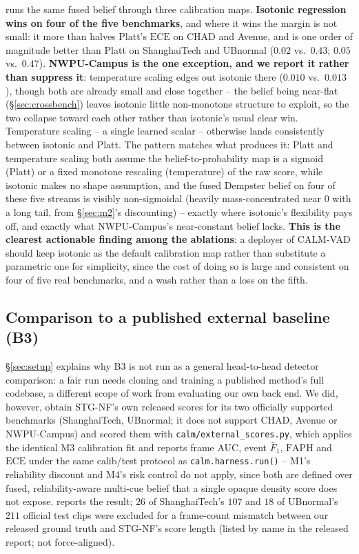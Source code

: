 \documentclass[conference]{IEEEtran}
\newcommand{\faph}{\mathrm{FAPH}}
\newcommand{\ece}{\mathrm{ECE}}
\newcommand{\method}{CALM-VAD}
\begin{document}
 runs the same fused belief through three
calibration maps. \textbf{Isotonic regression wins on four of the five
benchmarks}, and where it wins the margin is not small: it more than halves
Platt's $\ece$ on CHAD and Avenue, and is one order of magnitude better than
Platt on ShanghaiTech and UBnormal ($0.02$ vs.\ $0.43$; $0.05$ vs.\ $0.47$).
\textbf{NWPU-Campus is the one exception, and we report it rather than
suppress it}: temperature scaling edges out isotonic there ($0.010$ vs.\
$0.013$), though both are already small and close together -- the belief
being near-flat (\S\ref{sec:crossbench}) leaves isotonic little
non-monotone structure to exploit, so the two collapse toward each other
rather than isotonic's usual clear win. Temperature scaling -- a single
learned scalar -- otherwise lands consistently between isotonic and Platt.
The pattern matches what produces it: Platt and temperature scaling both
assume the belief-to-probability map is a sigmoid (Platt) or a fixed
monotone rescaling (temperature) of the raw score, while isotonic makes no
shape assumption, and the fused Dempster belief on four of these five
streams is visibly non-sigmoidal (heavily mass-concentrated near $0$ with a
long tail, from \S\ref{sec:m2}'s discounting) -- exactly where isotonic's
flexibility pays off, and exactly what NWPU-Campus's near-constant belief
lacks. \textbf{This is the clearest actionable finding among the
ablations}: a deployer of \method{} should keep isotonic as the default
calibration map rather than substitute a parametric one for simplicity,
since the cost of doing so is large and consistent on four of five real
benchmarks, and a wash rather than a loss on the fifth.

\subsection{Comparison to a published external baseline (B3)}
\label{sec:b3}
\S\ref{sec:setup} explains why B3 is not run as a general head-to-head
detector comparison: a fair run needs cloning and training a published
method's full codebase, a different scope of work from evaluating our own
back end. We did, however, obtain STG-NF's own released scores
\cite{stgnf2023} for its two officially supported benchmarks (ShanghaiTech,
UBnormal; it does not support CHAD, Avenue or NWPU-Campus) and scored them
with \texttt{calm/external\_scores.py}, which applies the identical M3
calibration fit and reports frame AUC, event $\bar F_1$, $\faph$ and $\ece$
under the same calib/test protocol as \texttt{calm.harness.run()} -- M1's
reliability discount and M4's risk control do not apply, since both are
defined over fused, reliability-aware multi-cue belief that a single opaque
density score does not expose. \Cref{tab:b3} reports the result; $26$ of
ShanghaiTech's $107$ and $18$ of UBnormal's $211$ official test clips were
excluded for a frame-count mismatch between our released ground truth and
STG-NF's score length (listed by name in the released report; not
force-aligned).
\end{document}
